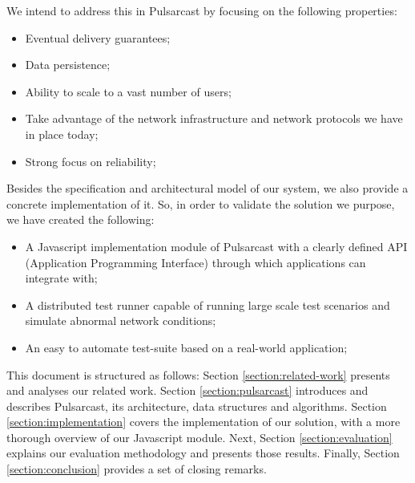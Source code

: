 We intend to address this in Pulsarcast by focusing on the following
properties:

\begin{itemize}
  \item
    Eventual delivery guarantees;
  \item
    Data persistence;
  \item
    Ability to scale to a vast number of users;
  \item
    Take advantage of the network infrastructure and network protocols we have in place today;
  \item
    Strong focus on reliability;
\end{itemize}

Besides the specification and architectural model of our system, we also provide
a concrete implementation of it. So, in order to validate the solution we
purpose, we have created the following:

\begin{itemize}
  \item
    A Javascript implementation module of Pulsarcast with a clearly defined API (Application Programming Interface) through which applications can integrate with;
  \item
    A distributed test runner capable of running large scale test scenarios and simulate abnormal network conditions;
  \item
    An easy to automate test-suite based on a real-world application;
\end{itemize}

This document is structured as follows: Section \ref{section:related-work}
presents and analyses our related work. Section \ref{section:pulsarcast}
introduces and describes Pulsarcast, its architecture, data structures and
algorithms. Section \ref{section:implementation} covers the implementation of
our solution, with a more thorough overview of our Javascript module. Next,
Section \ref{section:evaluation} explains our evaluation methodology and
presents those results. Finally, Section \ref{section:conclusion} provides a
set of closing remarks.
